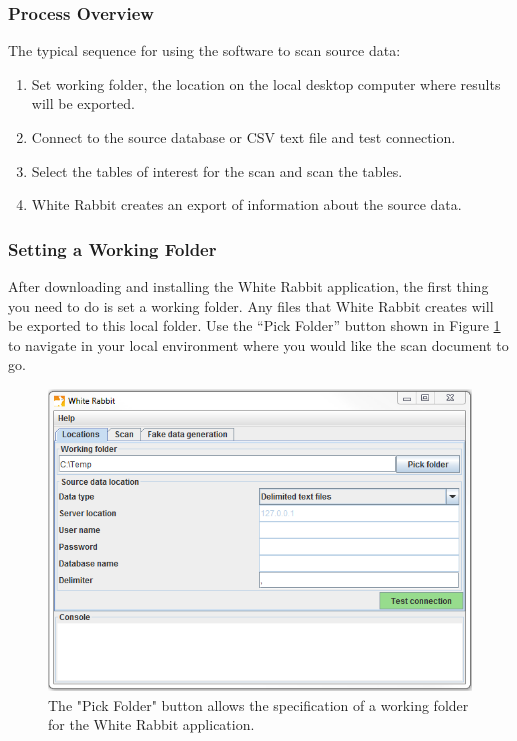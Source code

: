 \documentclass[11pt]{book}
\providecommand{\tightlist}{%
  \setlength{\itemsep}{0pt}\setlength{\parskip}{0pt}}
\theoremstyle{definition}
\theoremstyle{definition}
\theoremstyle{definition}
\theoremstyle{remark}
\begin{document}
\hypertarget{process-overview}{%
\subsubsection*{Process Overview}\label{process-overview}}

The typical sequence for using the software to scan source data:

\begin{enumerate}
\def\labelenumi{\arabic{enumi}.}
\tightlist
\item
  Set working folder, the location on the local desktop computer where results will be exported.
\item
  Connect to the source database or CSV text file and test connection.
\item
  Select the tables of interest for the scan and scan the tables.
\item
  White Rabbit creates an export of information about the source data.
\end{enumerate}

\hypertarget{setting-a-working-folder}{%
\subsubsection*{Setting a Working Folder}\label{setting-a-working-folder}}

After downloading and installing the White Rabbit application, the first thing you need to do is set a working folder. Any files that White Rabbit creates will be exported to this local folder. Use the ``Pick Folder'' button shown in Figure \ref{fig:WhiteRabbitLocation} to navigate in your local environment where you would like the scan document to go.

\begin{figure}
\includegraphics[width=1\linewidth]{images/ExtractTransformLoad/WhiteRabbitLocation} \caption{The "Pick Folder" button allows the specification of a working folder for the White Rabbit application.}\label{fig:WhiteRabbitLocation}
\end{figure}
\end{document}
